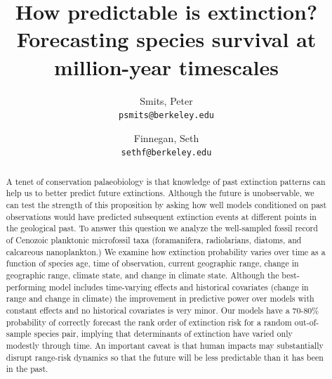 \documentclass[12pt,letterpaper]{article}
\title{How predictable is extinction? Forecasting species survival at million-year timescales}
\author{
 Smits, Peter\\
 \texttt{psmits@berkeley.edu} 
 \and
 Finnegan, Seth\\
 \texttt{sethf@berkeley.edu}
}
\date{}
\begin{document}
\begin{refsection}

\maketitle

\linenumbers{}
\modulolinenumbers[3]

\begin{abstract}
 A tenet of conservation palaeobiology is that knowledge of past extinction patterns can help us to better predict future extinctions. Although the future is unobservable, we can test the strength of this proposition by asking how well models conditioned on past observations would have predicted subsequent extinction events at different points in the geological past. To answer this question we analyze the well-sampled fossil record of Cenozoic planktonic microfossil taxa (foramanifera, radiolarians, diatoms, and calcareous nanoplankton.) We examine how extinction probability varies over time as a function of species age, time of observation, current geographic range, change in geographic range, climate state, and change in climate state. Although the best-performing model includes time-varying effects and historical covariates (change in range and change in climate) the improvement in predictive power over models with constant effects and no historical covariates is very minor. Our models have a 70-80\% probability of correctly forecast the rank order of extinction risk for a random out-of-sample species pair, implying that determinants of extinction have varied only modestly through time. An important caveat is that human impacts may substantially disrupt range-risk dynamics so that the future will be less predictable than it has been in the past.


\end{abstract}
\end{refsection}
\end{document}
